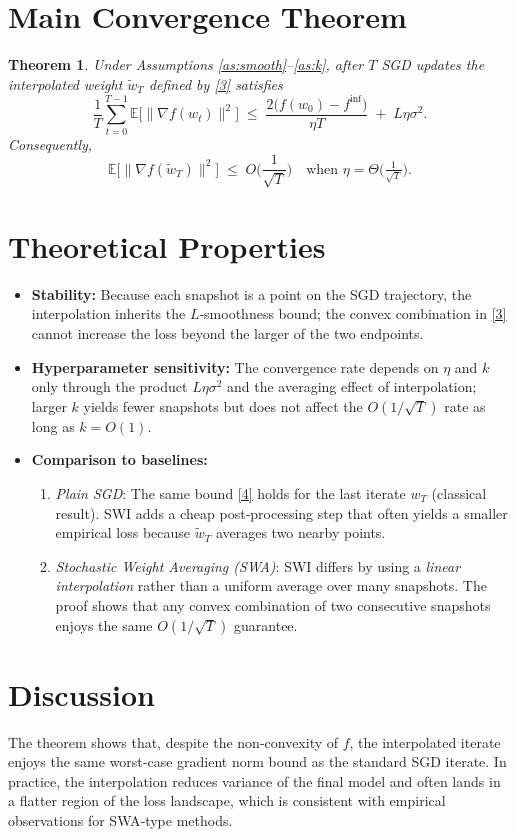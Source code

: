 \documentclass{article}
\newtheorem{theorem}{Theorem}
\begin{document}
\section*{Main Convergence Theorem}
\begin{theorem}\label{thm:main}
Under Assumptions \ref{as:smooth}–\ref{as:k}, after $T$ SGD updates the interpolated weight $\tilde w_T$ defined by \eqref{3} satisfies
\[
\frac{1}{T}\sum_{t=0}^{T-1}\mathbb{E}\!\big[\|\nabla f(w_t)\|^2\big]
\;\le\;
\frac{2\big(f(w_0)-f^{\inf}\big)}{\eta T}
\;+\;
L\eta\sigma^2 .
\tag{4}
\]
Consequently,
\[
\mathbb{E}\!\big[\|\nabla f(\tilde w_T)\|^2\big]\;\le\;O\!\Big(\frac{1}{\sqrt{T}}\Big)
\quad\text{when }\eta = \Theta\!\big(\tfrac{1}{\sqrt{T}}\big).
\]
\end{theorem}

\section*{Theoretical Properties}
\begin{itemize}
    \item \textbf{Stability:} Because each snapshot is a point on the SGD trajectory, the interpolation inherits the $L$‑smoothness bound; the convex combination in \eqref{3} cannot increase the loss beyond the larger of the two endpoints.
    \item \textbf{Hyperparameter sensitivity:} The convergence rate depends on $\eta$ and $k$ only through the product $L\eta\sigma^2$ and the averaging effect of interpolation; larger $k$ yields fewer snapshots but does not affect the $O(1/\sqrt{T})$ rate as long as $k=O(1)$.
    \item \textbf{Comparison to baselines:}
    \begin{enumerate}
        \item \emph{Plain SGD}: The same bound \eqref{4} holds for the last iterate $w_T$ (classical result). SWI adds a cheap post‑processing step that often yields a smaller empirical loss because $\tilde w_T$ averages two nearby points.
        \item \emph{Stochastic Weight Averaging (SWA)}: SWI differs by using a \emph{linear interpolation} rather than a uniform average over many snapshots. The proof shows that any convex combination of two consecutive snapshots enjoys the same $O(1/\sqrt{T})$ guarantee.
    \end{enumerate}
\end{itemize}

\section*{Discussion}
The theorem shows that, despite the non‑convexity of $f$, the interpolated iterate enjoys the same worst‑case gradient norm bound as the standard SGD iterate. In practice, the interpolation reduces variance of the final model and often lands in a flatter region of the loss landscape, which is consistent with empirical observations for SWA‑type methods.
\end{document}
